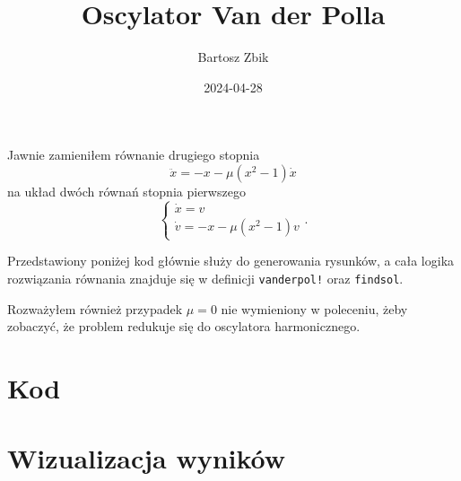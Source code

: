 \documentclass[12pt]{article}
\title{Oscylator Van der Polla}
\author{Bartosz Zbik}
\date{2024-04-28} %
\begin{document}
\maketitle %

Jawnie zamieniłem równanie drugiego stopnia
\begin{equation}
\ddot x = - x  - \mu (x^2 - 1) \dot x
\end{equation}
na układ dwóch równań stopnia pierwszego
\begin{equation}
\begin{cases}
\dot x = v \\
\dot v  =  - x  - \mu (x^2 - 1) v
\end{cases}.
\end{equation}

Przedstawiony poniżej kod głównie służy do generowania rysunków, a cała logika rozwiązania równania znajduje się w definicji
\texttt{vanderpol!} oraz \texttt{findsol}.

Rozważyłem również przypadek $\mu=0$ nie wymieniony w poleceniu, żeby zobaczyć, że problem redukuje się do oscylatora harmonicznego.

\section{Kod}
\clearpage


\section{Wizualizacja wyników}

\end{document}
